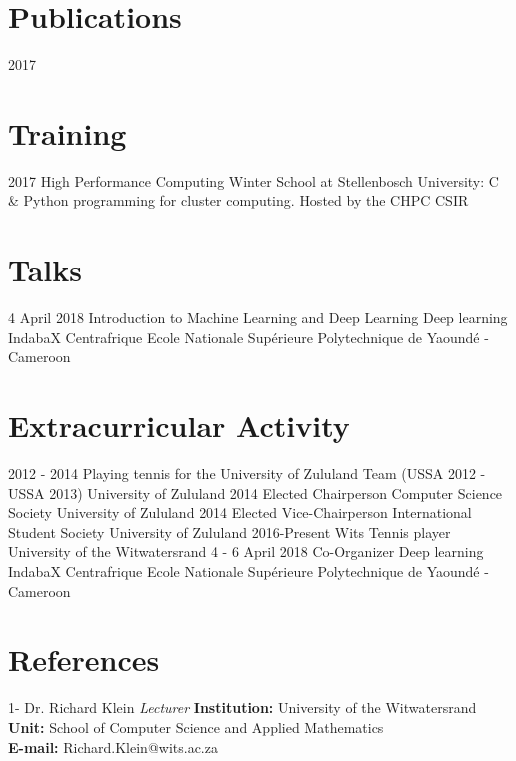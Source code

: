\documentclass[letterpaper]{moderncv}        %
\begin{document}

	
\section{Publications}
\cventry
{2017}
{}
{}
{}
{\textit{}}
{}

\section{Training}
\cventry
{2017}
{High Performance Computing Winter School at Stellenbosch University: C \& Python programming for cluster computing.}
{Hosted by the CHPC}
{CSIR}
{\textit{}}
{}

\section{Talks}
\cventry
{4 April 2018}
{Introduction to Machine Learning and Deep Learning}
{Deep learning IndabaX Centrafrique}
{Ecole Nationale Supérieure Polytechnique de Yaoundé - Cameroon}
{\textit{}}
{}

\newpage
	
\section{Extracurricular Activity}
\cventry
{2012 - 2014}
{Playing tennis for the University of Zululand Team (USSA 2012 - USSA 2013)}
{University of Zululand}
{}
{\textit{}}
{}
\cventry
{2014}
{Elected Chairperson Computer Science Society}
{University of Zululand}
{}
{\textit{}}
{}
\cventry
{2014}
{Elected Vice-Chairperson International Student Society}
{University of Zululand}
{}
{\textit{}}
{}	
\cventry
{2016-Present}
{Wits Tennis player}
{University of the Witwatersrand}
{}
{\textit{}}
{}
\cventry
{4 - 6 April 2018}
{Co-Organizer Deep learning IndabaX Centrafrique}
{Ecole Nationale Supérieure Polytechnique de Yaoundé - Cameroon}
{}
{\textit{}}
{}

\section{References}
\cventry
{1-}
{Dr. Richard Klein}
{}
{\textit{Lecturer}}
{}
{\textbf{Institution:} University of the Witwatersrand\\
	\textbf{Unit:} School of Computer Science and Applied Mathematics\\
	\textbf{E-mail:} Richard.Klein@wits.ac.za}
\vspace{1mm}
\end{document}
